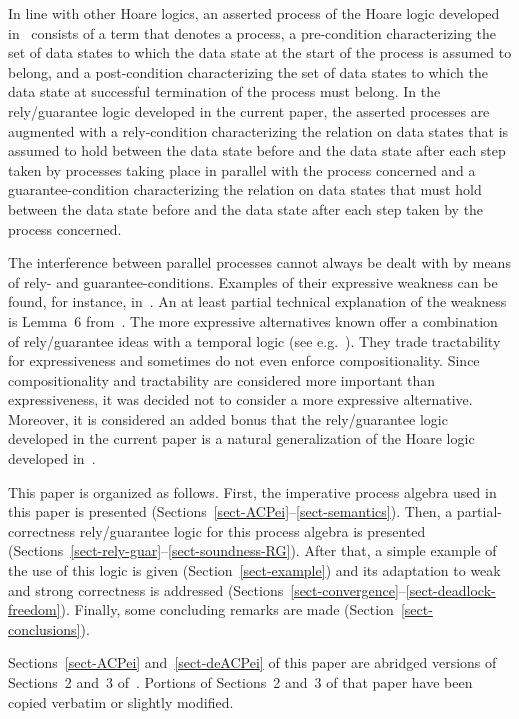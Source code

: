 \documentclass[runningheads]{llncs}
\begin{document}
In line with other Hoare logics, an asserted process of the Hoare logic 
developed in~\cite{BM19b} consists of a term that denotes a process, a 
pre-condition characterizing the set of data states to which the data 
state at the start of the process is assumed to belong, and a 
post-condition characterizing the set of data states to which the data 
state at successful termination of the process must belong.
In the rely/guarantee logic developed in the current paper, the asserted 
processes are augmented with a rely-condition characterizing the 
relation on data states that is assumed to hold between the data state 
before and the data state after each step taken by processes taking 
place in parallel with the process concerned and a guarantee-condition 
characterizing the relation on data states that must hold between the 
data state before and the data state after each step taken by the 
process concerned.

The interference between parallel processes cannot always be dealt with 
by means of rely- and guarantee-conditions.
Examples of their expressive weakness can be found, for instance, 
in~\cite{JP11a,JY19a,Yat24a}.
An at least partial technical explanation of the weakness is Lemma~6 
from~\cite{CJ07a}.
The more expressive alternatives known offer a combination of 
rely/guarantee ideas with a temporal logic 
(see e.g.~\cite{GCPV09a,STEPR14a}).
They trade tractability for expressiveness and sometimes do not even 
enforce compositionality.
Since compositionality and tractability are considered more important 
than expressiveness, it was decided not to consider a more expressive 
alternative.
Moreover, it is considered an added bonus that the rely/guarantee logic 
developed in the current paper is a natural generalization of the Hoare
logic developed in~\cite{BM19b}.

This paper is organized as follows.
First, the imperative process algebra used in this paper is presented 
(Sections~\ref{sect-ACPei}--\ref{sect-semantics}).
Then, a partial-correctness rely/guar\-antee logic for this process 
algebra is presented 
(Sections~\ref{sect-rely-guar}--\ref{sect-soundness-RG}).
After that, a simple example of the use of this logic is given 
(Section~\ref{sect-example}) 
and its adaptation to weak and strong correctness is addressed 
(Sections~\ref{sect-convergence}--\ref{sect-deadlock-freedom}).
Finally, some concluding remarks are made 
(Section~\ref{sect-conclusions}).

Sections~\ref{sect-ACPei} and~\ref{sect-deACPei} of this paper are 
abridged versions of Sections~2 and~3 of~\cite{BM19b}.
Portions of Sections~2 and~3 of that paper have been copied verbatim or 
slightly modified.
\end{document}
